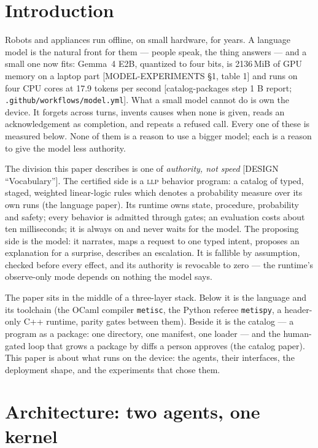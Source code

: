 \documentclass[11pt]{article}
\newcommand{\llp}{\textsc{llp}}
\newcommand{\metisc}{\texttt{metisc}}
\newcommand{\metispy}{\texttt{metispy}}
\newcommand{\src}[1]{{\footnotesize\textsf{[#1]}}}
\begin{document}
\section{Introduction}\label{sec:intro}

Robots and appliances run offline, on small hardware, for years. A language
model is the natural front for them --- people speak, the thing answers --- and
a small one now fits: Gemma~4 E2B, quantized to four bits, is 2136\,MiB of
GPU memory on a laptop part \src{MODEL-EXPERIMENTS \S1, table 1} and runs on
four CPU cores at 17.9 tokens per second \src{catalog-packages step 1 B report;
\texttt{.github/workflows/model.yml}}. What a small model cannot do is own the
device. It forgets across turns, invents causes when none is given, reads an
acknowledgement as completion, and repeats a refused call. Every one of these
is measured below. None of them is a reason to use a bigger model; each is a
reason to give the model less authority.

The division this paper describes is one of \emph{authority, not speed}
\src{DESIGN ``Vocabulary''}. The certified side is a \llp{} behavior program:
a catalog of typed, staged, weighted linear-logic rules which denotes a
probability measure over its own runs (the language paper). Its runtime owns
state, procedure, probability and safety; every behavior is admitted through
gates; an evaluation costs about ten milliseconds; it is always on and never
waits for the model. The proposing side is the model: it narrates, maps a
request to one typed intent, proposes an explanation for a surprise, describes
an escalation. It is fallible by assumption, checked before every effect, and
its authority is revocable to zero --- the runtime's observe-only mode depends
on nothing the model says.

The paper sits in the middle of a three-layer stack. Below it is the language
and its toolchain (the OCaml compiler \metisc{}, the Python referee \metispy{},
a header-only C++ runtime, parity gates between them). Beside it is the catalog
--- a program as a package: one directory, one manifest, one loader --- and the
human-gated loop that grows a package by diffs a person approves (the catalog
paper). This paper is about what runs on the device: the agents, their
interfaces, the deployment shape, and the experiments that chose them.

\section{Architecture: two agents, one kernel}\label{sec:arch}
\end{document}
